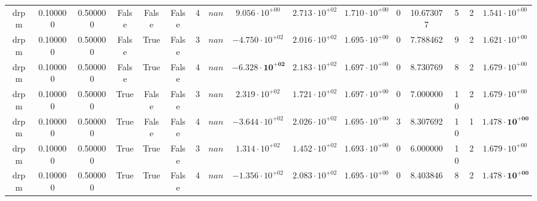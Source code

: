 \begin{table}
\begin{tabular}{cccccccccccccccc}
drpm & 0.100000 & 0.500000 & False & False & False & 4 & $nan$ & $9.056 \cdot 10^{+00}$ & $2.713 \cdot 10^{+02}$ & $1.710 \cdot 10^{+00}$ & 0 & 10.673077 & 5 & 2 & $1.541 \cdot 10^{+00}$ \\
drpm & 0.100000 & 0.500000 & False & True & False & 3 & $nan$ & $-4.750 \cdot 10^{+02}$ & $2.016 \cdot 10^{+02}$ & $1.695 \cdot 10^{+00}$ & 0 & 7.788462 & 9 & 2 & $1.621 \cdot 10^{+00}$ \\
drpm & 0.100000 & 0.500000 & False & True & False & 4 & $nan$ & $\mathbf{-6.328 \cdot 10^{+02}}$ & $2.183 \cdot 10^{+02}$ & $1.697 \cdot 10^{+00}$ & 0 & 8.730769 & 8 & 2 & $1.679 \cdot 10^{+00}$ \\
drpm & 0.100000 & 0.500000 & True & False & False & 3 & $nan$ & $2.319 \cdot 10^{+02}$ & $1.721 \cdot 10^{+02}$ & $1.697 \cdot 10^{+00}$ & 0 & 7.000000 & 10 & 2 & $1.679 \cdot 10^{+00}$ \\
drpm & 0.100000 & 0.500000 & True & False & False & 4 & $nan$ & $-3.644 \cdot 10^{+02}$ & $2.026 \cdot 10^{+02}$ & $1.695 \cdot 10^{+00}$ & 3 & 8.307692 & 10 & 1 & $\mathbf{1.478 \cdot 10^{+00}}$ \\
drpm & 0.100000 & 0.500000 & True & True & False & 3 & $nan$ & $1.314 \cdot 10^{+02}$ & $1.452 \cdot 10^{+02}$ & $1.693 \cdot 10^{+00}$ & 0 & 6.000000 & 10 & 2 & $1.679 \cdot 10^{+00}$ \\
drpm & 0.100000 & 0.500000 & True & True & False & 4 & $nan$ & $-1.356 \cdot 10^{+02}$ & $2.083 \cdot 10^{+02}$ & $1.695 \cdot 10^{+00}$ & 0 & 8.403846 & 8 & 2 & $\mathbf{1.478 \cdot 10^{+00}}$ \\
\bottomrule
\end{tabular}
\end{table}
